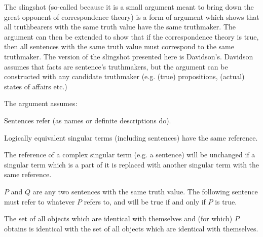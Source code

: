 The slingshot (so-called because it is a small argument meant to bring down the great opponent of correspondence theory) is a form of argument which shows that all truthbearers with the same truth value have the same truthmaker.
The argument can then be extended to show that if the correspondence theory is true, then all sentences with the same truth value must correspond to the same truthmaker.
The version of the slingshot presented here is Davidson's.
\parencite[753]{Davidson_1969}
Davidson assumes that facts are sentence's truthmakers, but the argument can be constructed with any candidate truthmaker (e.g. (true) propositions, (actual) states of affairs etc.)
\parencite[752]{Davidson_1969}

The argument assumes:

	\begin{thesis} \label{srefer}
	Sentences refer (as names or definite descriptions do).
	\end{thesis}


	\begin{thesis} \label{sameref}
	Logically equivalent singular terms (including sentences) have the same reference.
	\end{thesis}


	\begin{thesis} \label{constref}
	The reference of a complex singular term (e.g. a sentence) will be unchanged if a singular term which is a part of it is replaced with another singular term with the same reference.
	\end{thesis}

$P$ and $Q$ are any two sentences with the same truth value.
The following sentence must refer to whatever $P$ refers to, and will be true if and only if $P$ is true.

	\begin{example} \label{setP}
	The set of all objects which are identical with themselves and (for which) $P$ obtains is identical with the set of all objects which are identical with themselves.
	\end{example}

